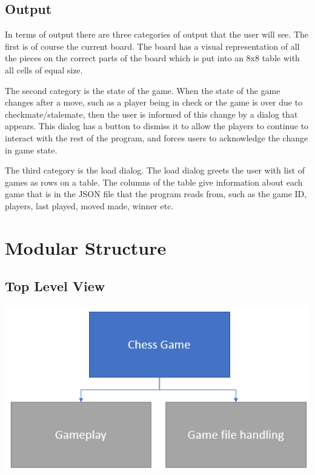 \documentclass[]{report}
\begin{document}
\subsection{Output}
In terms of output there are three categories of output that the user will see. The first is of course the current board. The board has a visual representation of all the pieces on the correct parts of the board which is put into an 8x8 table with all cells of equal size. 

The second category is the state of the game. When the state of the game changes after a move, such as a player being in check or the game is over due to checkmate/stalemate, then the user is informed of this change by a dialog that appears. This dialog has a button to dismiss it to allow the players to continue to interact with the rest of the program, and forces users to acknowledge the change in game state.

The third category is the load dialog. The load dialog greets the user with list of games as rows on a table. The columns of the table give information about each game that is in the JSON file that the program reads from, such as the game ID, players, last played, moved made, winner etc. 
\section{Modular Structure}
\subsection{Top Level View}
\begin{center}
	\includegraphics{images/design-charts/top_level}
\end{center}
\end{document}
